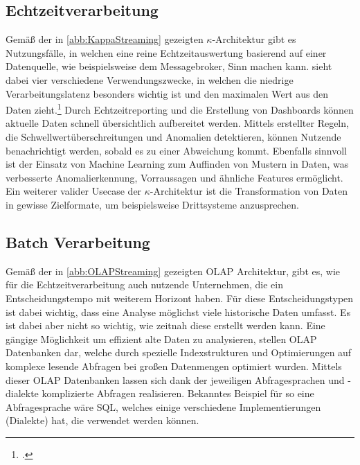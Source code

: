 \subsection{Echtzeitverarbeitung}
Gemäß der in \autoref{abb:KappaStreaming} gezeigten $\kappa$-Architektur gibt es Nutzungsfälle, in welchen eine reine Echtzeitauswertung basierend auf einer Datenquelle, wie beispielsweise dem Messagebroker, Sinn machen kann. \citeauthor{Belur.2020} sieht dabei vier verschiedene Verwendungszwecke, in welchen die niedrige Verarbeitungslatenz besonders wichtig ist und den maximalen Wert aus den Daten zieht.\footcite[Vgl. auch im Folgenden][]{Belur.2020} Durch Echtzeitreporting und die Erstellung von Dashboards können aktuelle Daten schnell übersichtlich aufbereitet werden. Mittels erstellter Regeln, die Schwellwertüberschreitungen und Anomalien detektieren, können Nutzende benachrichtigt werden, sobald es zu einer Abweichung kommt. Ebenfalls sinnvoll ist der Einsatz von Machine Learning zum Auffinden von Mustern in Daten, was verbesserte Anomalierkennung, Vorraussagen und ähnliche Features ermöglicht. Ein weiterer valider Usecase der $\kappa$-Architektur ist die Transformation von Daten in gewisse Zielformate, um beispielsweise Drittsysteme anzusprechen.




\subsection{Batch Verarbeitung}

Gemäß der in \autoref{abb:OLAPStreaming} gezeigten \ac{OLAP} Architektur, gibt es, wie für die Echtzeitverarbeitung auch nutzende Unternehmen, die ein Entscheidungstempo mit weiterem Horizont haben. Für diese Entscheidungstypen ist dabei wichtig, dass eine Analyse möglichst viele historische Daten umfasst. Es ist dabei aber nicht so wichtig, wie zeitnah diese erstellt werden kann. 
Eine gängige Möglichkeit um effizient alte Daten zu analysieren, stellen \ac{OLAP} Datenbanken dar, welche durch spezielle Indexstrukturen und Optimierungen auf komplexe lesende Abfragen bei großen Datenmengen optimiert wurden.  Mittels dieser \ac{OLAP} Datenbanken lassen sich dank der jeweiligen Abfragesprachen und -dialekte komplizierte Abfragen realisieren. Bekanntes Beispiel für so eine Abfragesprache wäre \ac{SQL}, welches einige verschiedene Implementierungen (Dialekte) hat, die verwendet werden können. 